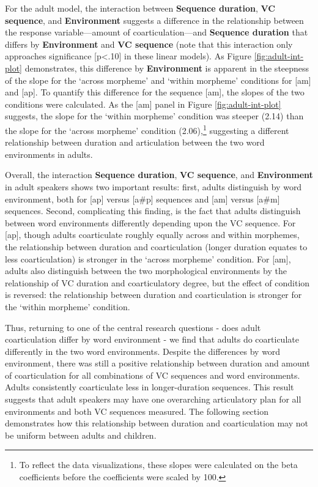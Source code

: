 \documentclass[
]{article}
\begin{document}
For the adult model, the interaction between \textbf{Sequence duration}, \textbf{VC sequence}, and \textbf{Environment} suggests a difference in the relationship between the response variable---amount of coarticulation---and \textbf{Sequence duration} that differs by \textbf{Environment} and \textbf{VC sequence} (note that this interaction only approaches significance {[}p\textless.10{]} in these linear models). As Figure \ref{fig:adult-int-plot} demonstrates, this difference by \textbf{Environment} is apparent in the steepness of the slope for the `across morpheme' and `within morpheme' conditions for {[}am{]} and {[}ap{]}. To quantify this difference for the sequence {[}am{]}, the slopes of the two conditions were calculated. As the {[}am{]} panel in Figure \ref{fig:adult-int-plot} suggests, the slope for the `within morpheme' condition was steeper (2.14) than the slope for the `across morpheme' condition (2.06),\footnote{To reflect the data visualizations, these slopes were calculated on the beta coefficients before the coefficients were scaled by 100.} suggesting a different relationship between duration and articulation between the two word environments in adults.

Overall, the interaction \textbf{Sequence duration}, \textbf{VC sequence}, and \textbf{Environment} in adult speakers shows two important results: first, adults distinguish by word environment, both for {[}ap{]} versus {[}a\#p{]} sequences and {[}am{]} versus {[}a\#m{]} sequences. Second, complicating this finding, is the fact that adults distinguish between word environments differently depending upon the VC sequence. For {[}ap{]}, though adults coarticulate roughly equally across and within morphemes, the relationship between duration and coarticulation (longer duration equates to less coarticulation) is stronger in the `across morpheme' condition. For {[}am{]}, adults also distinguish between the two morphological environments by the relationship of VC duration and coarticulatory degree, but the effect of condition is reversed: the relationship between duration and coarticulation is stronger for the `within morpheme' condition.

Thus, returning to one of the central research questions - does adult coarticulation differ by word environment - we find that adults do coarticulate differently in the two word environments. Despite the differences by word environment, there was still a positive relationship between duration and amount of coarticulation for all combinations of VC sequences and word environments. Adults consistently coarticulate less in longer-duration sequences. This result suggests that adult speakers may have one overarching articulatory plan for all environments and both VC sequences measured. The following section demonstrates how this relationship between duration and coarticulation may not be uniform between adults and children.
\end{document}
